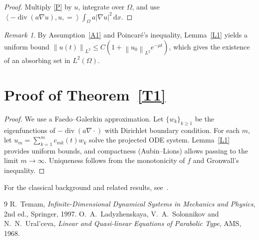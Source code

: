 \documentclass[11pt,a4paper]{article}
\theoremstyle{definition}
\theoremstyle{remark}
\newtheorem{remark}[theorem]{Remark}
\newcommand{\Om}{\Omega}
\newcommand{\norm}[1]{\left\lVert #1\right\rVert}
\newcommand{\inner}[2]{\left\langle #1,#2\right\rangle}
\newcommand{\dd}{\,\mathrm{d}}
\DeclareMathOperator{\divg}{div}
\newcommand{\pde}[1]{\eqref{#1}}
\begin{document}
\begin{proof}
Multiply \pde{P} by $u$, integrate over $\Om$, and use
$\inner{-\divg(a\nabla u),u}=\int_\Om a|\nabla u|^2\dd x$.
\end{proof}

\begin{remark}
By Assumption~\ref{A1} and Poincaré's inequality, Lemma~\ref{L1} yields
a uniform bound $\norm{u(t)}_{L^2}\le C(1+\norm{u_0}_{L^2}e^{-\mu t})$,
which gives the existence of an absorbing set in $L^2(\Om)$.
\end{remark}

\section{Proof of Theorem~\ref{T1}}

\begin{proof}
We use a Faedo--Galerkin approximation. Let $\{w_k\}_{k\ge1}$ be the
eigenfunctions of $-\divg(a\nabla\cdot)$ with Dirichlet boundary
condition. For each $m$, let $u_m=\sum_{k=1}^m c_{mk}(t)w_k$ solve the
projected ODE system. Lemma~\ref{L1} provides uniform bounds, and
compactness (Aubin--Lions) allows passing to the limit $m\to\infty$.
Uniqueness follows from the monotonicity of $f$ and Gronwall's inequality.
\end{proof}

For the classical background and related results, see~\cite{Temam,Lady}.

\begin{thebibliography}{9}
 R.~Temam, \emph{Infinite-Dimensional Dynamical Systems in
Mechanics and Physics}, 2nd ed., Springer, 1997.
 O.~A.~Ladyzhenskaya, V.~A.~Solonnikov and N.~N.~Ural'ceva,
\emph{Linear and Quasi-linear Equations of Parabolic Type}, AMS, 1968.
\end{thebibliography}
\end{document}
